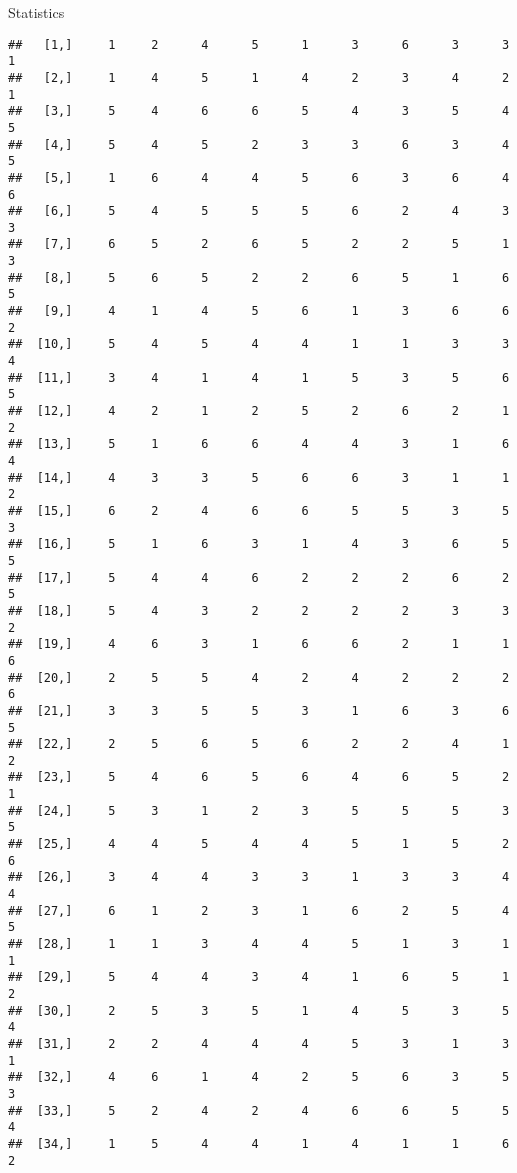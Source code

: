 \documentclass[
  ignorenonframetext,
]{beamer}
\begin{document}
\begin{frame}[fragile]{Statistics}
\begin{verbatim}
##   [1,]     1     2      4      5      1      3      6      3      3      1
##   [2,]     1     4      5      1      4      2      3      4      2      1
##   [3,]     5     4      6      6      5      4      3      5      4      5
##   [4,]     5     4      5      2      3      3      6      3      4      5
##   [5,]     1     6      4      4      5      6      3      6      4      6
##   [6,]     5     4      5      5      5      6      2      4      3      3
##   [7,]     6     5      2      6      5      2      2      5      1      3
##   [8,]     5     6      5      2      2      6      5      1      6      5
##   [9,]     4     1      4      5      6      1      3      6      6      2
##  [10,]     5     4      5      4      4      1      1      3      3      4
##  [11,]     3     4      1      4      1      5      3      5      6      5
##  [12,]     4     2      1      2      5      2      6      2      1      2
##  [13,]     5     1      6      6      4      4      3      1      6      4
##  [14,]     4     3      3      5      6      6      3      1      1      2
##  [15,]     6     2      4      6      6      5      5      3      5      3
##  [16,]     5     1      6      3      1      4      3      6      5      5
##  [17,]     5     4      4      6      2      2      2      6      2      5
##  [18,]     5     4      3      2      2      2      2      3      3      2
##  [19,]     4     6      3      1      6      6      2      1      1      6
##  [20,]     2     5      5      4      2      4      2      2      2      6
##  [21,]     3     3      5      5      3      1      6      3      6      5
##  [22,]     2     5      6      5      6      2      2      4      1      2
##  [23,]     5     4      6      5      6      4      6      5      2      1
##  [24,]     5     3      1      2      3      5      5      5      3      5
##  [25,]     4     4      5      4      4      5      1      5      2      6
##  [26,]     3     4      4      3      3      1      3      3      4      4
##  [27,]     6     1      2      3      1      6      2      5      4      5
##  [28,]     1     1      3      4      4      5      1      3      1      1
##  [29,]     5     4      4      3      4      1      6      5      1      2
##  [30,]     2     5      3      5      1      4      5      3      5      4
##  [31,]     2     2      4      4      4      5      3      1      3      1
##  [32,]     4     6      1      4      2      5      6      3      5      3
##  [33,]     5     2      4      2      4      6      6      5      5      4
##  [34,]     1     5      4      4      1      4      1      1      6      2

\end{verbatim}
\end{frame}
\end{document}
